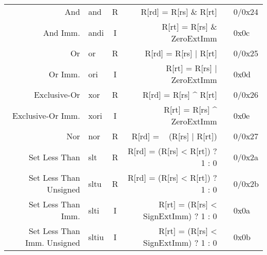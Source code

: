 \begin{tabularx}{\textwidth}{NMcDcO}
    \midrule
    And                                                 & and                                      & R & R[rd] = R[rs] \& R[rt]                                  &                                  & 0/0x24 \\
    And Imm.                                            & andi                                     & I & R[rt] = R[rs] \& ZeroExtImm                             & \footnotemark[3]                 & 0x0c   \\
    Or                                                  & or                                       & R & R[rd] = R[rs] | R[rt]                                   &                                  & 0/0x25 \\
    Or Imm.                                             & ori                                      & I & R[rt] = R[rs] | ZeroExtImm                              & \footnotemark[3]                 & 0x0d   \\
    Exclusive-Or                                        & xor                                      & R & R[rd] = R[rs] \textasciicircum{} R[rt]                  &                                  & 0/0x26 \\
    Exclusive-Or Imm.                                   & xori                                     & I & R[rt] = R[rs] \textasciicircum{} ZeroExtImm             & \footnotemark[3]                 & 0x0e   \\
    Nor                                                 & nor                                      & R & R[rd] = ~ (R[rs] | R[rt])                               &                                  & 0/0x27 \\
    \midrule
    Set Less Than                                       & slt                                      & R & R[rd] = (R[rs] < R[rt]) ? 1 : 0                         &                                  & 0/0x2a \\
    Set Less Than Unsigned                              & sltu                                     & R & R[rd] = (R[rs] < R[rt]) ? 1 : 0                         & \footnotemark[6]                 & 0/0x2b \\
    Set Less Than Imm.                                  & slti                                     & I & R[rt] = (R[rs] < SignExtImm) ? 1 : 0                    & \footnotemark[2]                 & 0x0a   \\
    Set Less Than Imm. Unsigned                         & sltiu                                    & I & R[rt] = (R[rs] < SignExtImm) ? 1 : 0                    & \footnotemark[2]\footnotemark[6] & 0x0b   \\

\end{tabularx}
